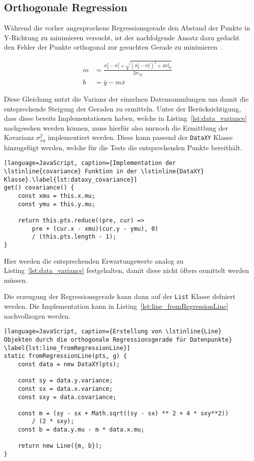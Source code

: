 \subsection{Orthogonale Regression}\label{ch:orthogonale_regression}

Während die vorher angesprochene Regressionsgerade den Abstand der Punkte in Y-Richtung zu minimieren versucht, ist der nachfolgende Ansatz dazu gedacht den Fehler der Punkte orthogonal zur gesuchten Gerade zu minimieren~\cite{JuergenHedderich2020}.%

\begin{equation}
    \begin{split}
        m &= \frac{\sigma_y^2 - \sigma_x^2 + \sqrt{(\sigma_y^2 - \sigma_x^2)^2 + 4\sigma_{xy}^2}}{2\sigma_{xy}} \\
        b &= \bar{y} - m \bar{x}
    \end{split}
    \label{eq:orthogonal_regression}
\end{equation}

Diese Gleichung nutzt die Varianz der einzelnen Datensammlungen um damit die entsprechende Steigung der Geraden zu ermitteln.
Unter der Berücksichtigung, dass diese bereits Implementationen haben, welche in Listing~\ref{lst:data_variance} nachgesehen werden können, muss hierfür also nurnoch die Ermittlung der Kovarianz $\sigma_{xy}^2$ implementiert werden.
Diese kann passend der \lstinline{DataXY} Klasse hinzugefügt werden, welche für die Tests die entsprechenden Punkte bereithält.

\begin{lstlisting}[language=JavaScript, caption={Implementation der \lstinline{covariance} Funktion in der \lstinline{DataXY} Klasse}.\label{lst:dataxy_covariance}]
get() covariance() {
    const xmu = this.x.mu;
    const ymu = this.y.mu;

    return this.pts.reduce((pre, cur) =>
        pre + (cur.x - xmu)(cur.y - ymu), 0)
        / (this.pts.length - 1);
}
\end{lstlisting}

Hier werden die entsprechenden Erwartungswerte analog zu Listing~\ref{lst:data_variance} festgehalten, damit diese nicht öfters ermittelt werden müssen.

Die erzeugung der Regressionsgerade kann dann auf der \lstinline{List} Klasse defniert werden.
Die Implementation kann in Listing~\ref{lst:line_fromRegressionLine} nachvollzogen werden.

\begin{lstlisting}[language=JavaScript, caption={Erstellung von \lstinline{Line} Objekten durch die orthogonale Regressionsgerade für Datenpunkte} \label{lst:line_fromRegressionLine}]
static fromRegressionLine(pts, g) {
    const data = new DataXY(pts);

    const sy = data.y.variance;
    const sx = data.x.variance;
    const sxy = data.covariance;

    const m = (sy - sx + Math.sqrt((sy - sx) ** 2 + 4 * sxy**2)) 
        / (2 * sxy);
    const b = data.y.mu - m * data.x.mu;

    return new Line({m, b});
}
\end{lstlisting}

